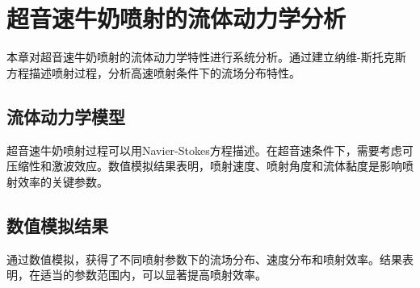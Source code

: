 \chapter{超音速牛奶喷射的流体动力学分析}

本章对超音速牛奶喷射的流体动力学特性进行系统分析。通过建立纳维-斯托克斯方程描述喷射过程，分析高速喷射条件下的流场分布特性。

\section{流体动力学模型}

超音速牛奶喷射过程可以用Navier-Stokes方程描述。在超音速条件下，需要考虑可压缩性和激波效应。数值模拟结果表明，喷射速度、喷射角度和流体黏度是影响喷射效率的关键参数。

\section{数值模拟结果}

通过数值模拟，获得了不同喷射参数下的流场分布、速度分布和喷射效率。结果表明，在适当的参数范围内，可以显著提高喷射效率。
